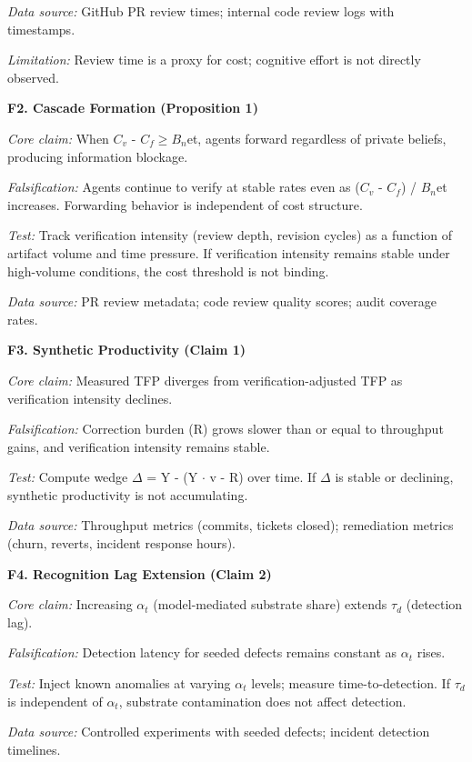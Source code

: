 \documentclass[11pt,a4paper]{article}
\begin{document}
\emph{Data source:} GitHub PR review times; internal code review logs with timestamps.

\emph{Limitation:} Review time is a proxy for cost; cognitive effort is not directly observed.

\textbf{F2. Cascade Formation (Proposition 1)}

\emph{Core claim:} When $C_v$ - $C_f \geq B_n$et, agents forward regardless of private beliefs, producing information blockage.

\emph{Falsification:} Agents continue to verify at stable rates even as ($C_v$ - $C_f$) / $B_n$et increases. Forwarding behavior is independent of cost structure.

\emph{Test:} Track verification intensity (review depth, revision cycles) as a function of artifact volume and time pressure. If verification intensity remains stable under high-volume conditions, the cost threshold is not binding.

\emph{Data source:} PR review metadata; code review quality scores; audit coverage rates.

\textbf{F3. Synthetic Productivity (Claim 1)}

\emph{Core claim:} Measured TFP diverges from verification-adjusted TFP as verification intensity declines.

\emph{Falsification:} Correction burden (R) grows slower than or equal to throughput gains, and verification intensity remains stable.

\emph{Test:} Compute wedge $\Delta$ = Y - (Y $\cdot$ v - R) over time. If $\Delta$ is stable or declining, synthetic productivity is not accumulating.

\emph{Data source:} Throughput metrics (commits, tickets closed); remediation metrics (churn, reverts, incident response hours).

\textbf{F4. Recognition Lag Extension (Claim 2)}

\emph{Core claim:} Increasing $\alpha_{t}$ (model-mediated substrate share) extends $\tau_{d}$ (detection lag).

\emph{Falsification:} Detection latency for seeded defects remains constant as $\alpha_{t}$ rises.

\emph{Test:} Inject known anomalies at varying $\alpha_{t}$ levels; measure time-to-detection. If $\tau_{d}$ is independent of $\alpha_{t}$, substrate contamination does not affect detection.

\emph{Data source:} Controlled experiments with seeded defects; incident detection timelines.
\end{document}
